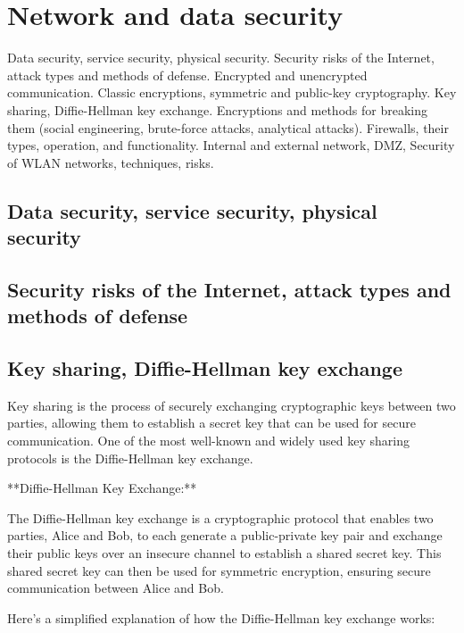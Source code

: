 \documentclass{article}
\begin{document}
\section{Network and data security}

Data security, service security, physical security. Security risks of the Internet, attack types and methods of defense. Encrypted and unencrypted communication. Classic encryptions, symmetric and public-key cryptography. Key sharing, Diffie-Hellman key exchange. Encryptions and methods for breaking them (social engineering, brute-force attacks, analytical attacks). Firewalls, their types, operation, and functionality. Internal and external network, DMZ, Security of WLAN networks, techniques, risks.


\subsection{Data security, service security, physical security}


\subsection{Security risks of the Internet, attack types and methods of defense}


\subsection{Key sharing, Diffie-Hellman key exchange}

Key sharing is the process of securely exchanging cryptographic keys between two parties, allowing them to establish a secret key that can be used for secure communication. One of the most well-known and widely used key sharing protocols is the Diffie-Hellman key exchange.

**Diffie-Hellman Key Exchange:**

The Diffie-Hellman key exchange is a cryptographic protocol that enables two parties, Alice and Bob, to each generate a public-private key pair and exchange their public keys over an insecure channel to establish a shared secret key. This shared secret key can then be used for symmetric encryption, ensuring secure communication between Alice and Bob.

Here's a simplified explanation of how the Diffie-Hellman key exchange works:
\end{document}
